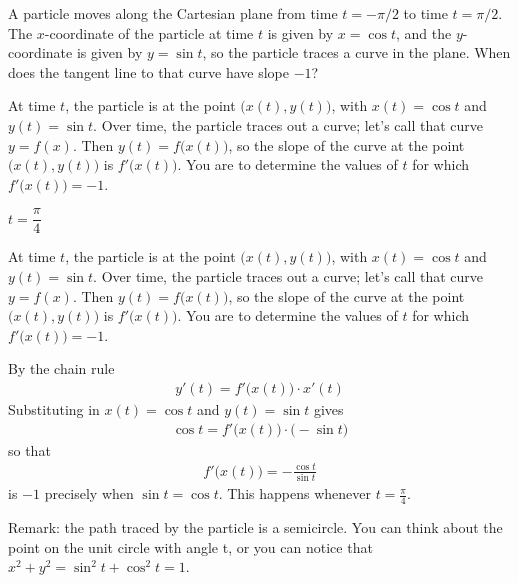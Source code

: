 \begin{question} A particle moves along the Cartesian plane from time $t=-\pi/2$ to time $t=\pi/2$. The $x$-coordinate of the particle at time $t$ is given by $x=\cos t$, and the $y$-coordinate is given by $y=\sin t$, so the particle traces a curve in the plane. When does the tangent line to that curve have slope $-1$?
\end{question}
\begin{hint}
           At time $t$, the particle is at the point $\big(x(t),y(t)\big)$,
           with $x(t)=\cos t$ and $y(t)=\sin t$.
           Over time, the particle traces out a curve; let's call that curve $y=f(x)$.
           Then $y(t) = f\big(x(t)\big)$, so
           the slope of the curve at the point $\big(x(t),y(t)\big)$
           is $f'\big(x(t)\big)$. You are to determine the values of $t$
           for which $f'\big(x(t)\big)=-1$.
\end{hint}
\begin{answer}
$t=\dfrac{\pi}{4}$
\end{answer}
\begin{solution}
At time $t$, the particle is at the point $\big(x(t),y(t)\big)$,
           with $x(t)=\cos t$ and $y(t)=\sin t$.
           Over time, the particle traces out a curve; let's call that curve $y=f(x)$.
           Then $y(t) = f\big(x(t)\big)$, so
           the slope of the curve at the point $\big(x(t),y(t)\big)$
           is $f'\big(x(t)\big)$. You are to determine the values of $t$
           for which $f'\big(x(t)\big)=-1$.

           By the chain rule
           \begin{align*}
               y'(t) = f'\big(x(t)\big) \cdot x'(t)
           \end{align*}
           Substituting in $x(t)=\cos t$ and $y(t)=\sin t$ gives
           \begin{align*}
               \cos t = f'\big(x(t)\big) \cdot \big(-\sin t\big)
           \end{align*}
           so that
           \begin{align*}
              f'\big(x(t)\big)  = -\frac{\cos t}{\sin t}
           \end{align*}
           is $-1$ precisely when $\sin t = \cos t$. This happens whenever
           $t = \frac{\pi}{4}$.

           Remark: the path traced by the particle is a semicircle. You can
           think about the point on the unit circle with angle t, or you
           can notice that $x^2 + y^2 = \sin^2t + \cos^2t = 1$.
\end{solution}



